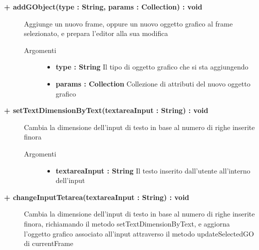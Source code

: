 \begin{description}
\begin{description}
	\end{description}
	
	
	\begin{description}
		\item[\textbf{\color{blue}+ addGObject(type : String, params : Collection) : void 	}] \hfill
			Aggiunge un nuovo frame, oppure un nuovo oggetto grafico al frame selezionato, e prepara l'editor alla sua modifica
			
		\begin{description}
			\item[Argomenti] \hfill
				\begin{itemize}
				
					\item \textbf{type : String	} \hfill
					Il tipo di oggetto grafico che si sta aggiungendo
					\item \textbf{params : Collection	} \hfill
					Collezione di attributi del nuovo oggetto grafico
				\end{itemize}
		\end{description}
	\end{description}
	
	\begin{description}
		\item[\textbf{\color{blue}+ setTextDimensionByText(textareaInput : String) : void	 	}] \hfill
			Cambia la dimensione dell'input di testo in base al numero di righe inserite finora
			
		\begin{description}
			\item[Argomenti] \hfill
				\begin{itemize}
				
					\item \textbf{textareaInput : String	} \hfill
					Il testo inserito dall'utente all'interno dell'input
				\end{itemize}
				
		\end{description}
	\end{description}
	
	\begin{description}
		\item[\textbf{\color{blue}+ changeInputTetarea(textareaInput : String) : void	 	}] \hfill
			Cambia la dimensione dell'input di testo in base al numero di righe inserite finora, richiamando il metodo setTextDimensionByText, e aggiorna l'oggetto grafico associato all'input attraverso il metodo updateSelectedGO di currentFrame
			

\end{description}
\end{description}
